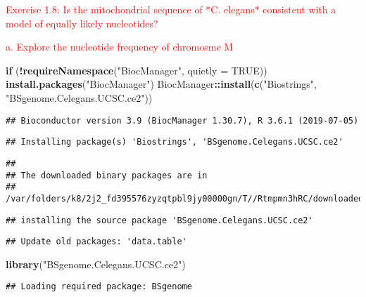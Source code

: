 \documentclass[]{article}
\newenvironment{Shaded}{\begin{snugshade}}{\end{snugshade}}
\newcommand{\KeywordTok}[1]{\textcolor[rgb]{0.13,0.29,0.53}{\textbf{#1}}}
\newcommand{\DataTypeTok}[1]{\textcolor[rgb]{0.13,0.29,0.53}{#1}}
\newcommand{\StringTok}[1]{\textcolor[rgb]{0.31,0.60,0.02}{#1}}
\newcommand{\OtherTok}[1]{\textcolor[rgb]{0.56,0.35,0.01}{#1}}
\newcommand{\ControlFlowTok}[1]{\textcolor[rgb]{0.13,0.29,0.53}{\textbf{#1}}}
\newcommand{\OperatorTok}[1]{\textcolor[rgb]{0.81,0.36,0.00}{\textbf{#1}}}
\newcommand{\NormalTok}[1]{#1}
\begin{document}
\textcolor{red}{Exercise 1.8: Is the mitochondrial sequence of *C. elegans* consistent with a model of equally likely nucleotides?}

\textcolor{red}{a. Explore the nucleotide frequency of chromosme M}

\begin{Shaded}
\begin{Highlighting}[]
\ControlFlowTok{if}\NormalTok{ (}\OperatorTok{!}\KeywordTok{requireNamespace}\NormalTok{(}\StringTok{"BiocManager"}\NormalTok{, }\DataTypeTok{quietly =} \OtherTok{TRUE}\NormalTok{))}
     \KeywordTok{install.packages}\NormalTok{(}\StringTok{"BiocManager"}\NormalTok{)}
\NormalTok{BiocManager}\OperatorTok{::}\KeywordTok{install}\NormalTok{(}\KeywordTok{c}\NormalTok{(}\StringTok{"Biostrings"}\NormalTok{, }\StringTok{"BSgenome.Celegans.UCSC.ce2"}\NormalTok{))}
\end{Highlighting}
\end{Shaded}

\begin{verbatim}
## Bioconductor version 3.9 (BiocManager 1.30.7), R 3.6.1 (2019-07-05)
\end{verbatim}

\begin{verbatim}
## Installing package(s) 'Biostrings', 'BSgenome.Celegans.UCSC.ce2'
\end{verbatim}

\begin{verbatim}
## 
## The downloaded binary packages are in
##  /var/folders/k8/2j2_fd395576zyzqtpbl9jy00000gn/T//Rtmpmn3hRC/downloaded_packages
\end{verbatim}

\begin{verbatim}
## installing the source package 'BSgenome.Celegans.UCSC.ce2'
\end{verbatim}

\begin{verbatim}
## Update old packages: 'data.table'
\end{verbatim}

\begin{Shaded}
\begin{Highlighting}[]
\KeywordTok{library}\NormalTok{(}\StringTok{"BSgenome.Celegans.UCSC.ce2"}\NormalTok{)}
\end{Highlighting}
\end{Shaded}

\begin{verbatim}
## Loading required package: BSgenome
\end{verbatim}
\end{document}
